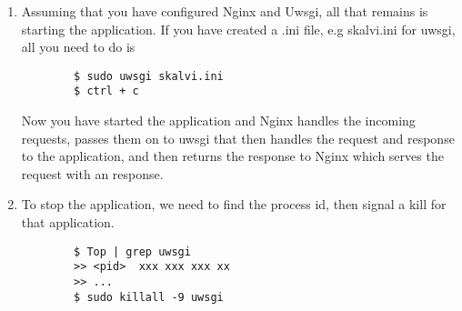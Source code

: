 \begin{enumerate}
    
    \item Assuming that you have configured Nginx and Uwsgi, all that remains is starting the application. 
    If you have created a .ini file, e.g skalvi.ini for uwsgi, all you need to do is 
    \begin{lstlisting}
        $ sudo uwsgi skalvi.ini
        $ ctrl + c
    \end{lstlisting}
    
    Now you have started the application and Nginx handles the incoming requests, passes them on to uwsgi that then handles the request and response to the application, and then returns the response to Nginx which serves the request with an response.
    
    \item To stop the application, we need to find the process id, then signal a kill for that application.
    \begin{lstlisting}
        $ Top | grep uwsgi
        >> <pid>  xxx xxx xxx xx
        >> ...
        $ sudo killall -9 uwsgi
    \end{lstlisting}
    
\end{enumerate}
    

\cleardoublepage